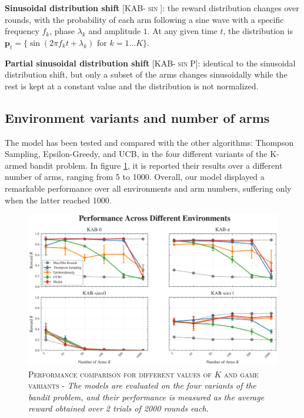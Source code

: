 \noindent \textbf{Sinusoidal distribution shift} [\textsc{KAB-$\sin$}]: the reward distribution changes over rounds, with the probability of each arm following a sine wave with a specific frequency $f_{k}$, phase $\lambda_{k}$ and amplitude $1$. At any given time $t$, the distribution is $\mathbf{p}_{t}=\{\sin(2\pi f_{k}
t+\lambda_{k})\text{  for }k=1\ldots K\}$.

\noindent \textbf{Partial sinusoidal distribution shift} [\textsc{KAB-$\sin$P}]: identical to the sinusoidal distribution shift, but only a subset of the arms changes sinusoidally while the rest is kept at a constant value and the distribution is not normalized.


\subsection{Environment variants and number of arms}

The model has been tested and compared with the other algorithms: Thompson Sampling, Epsilon-Greedy, and UCB, in the four different variants of the K-armed bandit problem.
In figure \ref{fig:perf_plot}, it is reported their results over a different number of arms, ranging from 5 to 1000.
Overall, our model displayed a remarkable performance over all environments and arm numbers, suffering only when the latter reached 1000.

\begin{figure}[H]
    \centering
    \includegraphics[width=1.\textwidth]{figures/performance_plot.png}
    \caption{\textsc{Performance comparison for different values of $K$ and game variants} - \textit{The models are evaluated on the four variants of the bandit problem, and their performance is measured as the average reward obtained over 2 trials of 2000 rounds each.}}
    \label{fig:perf_plot}
\end{figure}


